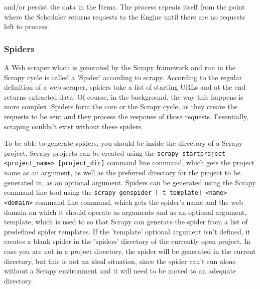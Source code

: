 \documentclass[12pt,a4paper,twoside]{report}
\begin{document}
and/or persist the data in the Items. The process repeats itself from the point where the Scheduler returns requests to the Engine until there are no requests left to process.


\subsubsection{Spiders}

A Web scraper which is generated by the Scrapy framework and run in the Scrapy cycle is called a 'Spider' according to scrapy. According to the regular definition of a web scraper, spiders take a list of starting URLs and at the end returns extracted data. Of course, in the background, the way this happens is more complex. Spiders form the core or the Scrapy cycle, as they create the requests to be sent and they process the response of those requests. Essentially, scraping couldn't exist without these spiders.

To be able to generate spiders, you should be inside the directory of a Scrapy project. Scrapy projects can be created using the \lstinline$scrapy startproject <project_name> [project_dir]$ command line command, which gets the project name as an argument, as well as the preferred directory for the project to be generated in, as an optional argument. Spiders can be generated using the Scrapy command line tool using the \lstinline$scrapy genspider [-t template] <name> <domain>$ command line command, which gets the spider's name and the web domain on which it should operate as arguments and as an optional argument, template, which is used to so that Scrapy can generate the spider from a list of predefined spider templates. If the 'template' optional argument isn't defined, it creates a blank spider in the 'spiders' directory of the currently open project. In case you are not in a project directory, the spider will be generated in the current directory, but this is not an ideal situation, since the spider can't run alone without a Scrapy environment and it will need to be moved to an adequate directory.
\end{document}
